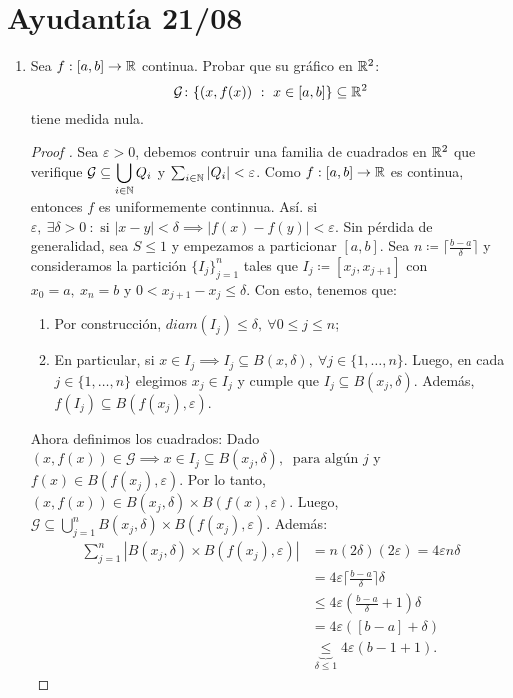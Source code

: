 
\section{Ayudantía 21/08}

\begin{enumerate}
	\item Sea $f: [a,b] \to \mathbb{R}$ continua. Probar que su gráfico en $\mathbb{R}^2$:
	\[ \mathcal{G} \colon \{ (x,f(x)) \ : \ x \in [a,b] \} \subseteq \mathbb{R}^2 \]
	\noindent tiene medida nula.
	\begin{proof}[Proof ]
		Sea $\varepsilon > 0$, debemos contruir una familia de cuadrados en $\mathbb{R}^2$ que verifique $\mathcal{G} \subseteq  \displaystyle\bigcup_{i \in \mathbb{N}} Q_i$ y $\sum_{i \in \mathbb{N}} |Q_i| < \varepsilon$. Como $f: [a,b] \to \mathbb{R}$ es continua, entonces $f$ es uniformemente continnua. Así. si $\varepsilon,\ \exists \delta > 0 \ : \text{ si } |x-y| < \delta \implies |f(x)-f(y)| < \varepsilon$. Sin pérdida de generalidad, sea $S \leq 1$ y empezamos a particionar $[a,b]$. Sea $n \coloneq \lceil \frac{b-a}{\delta} \rceil$ y consideramos la partición $\{ I_j \}_{j=1}^{n}$ tales que $I_j \coloneq [x_{j},x_{j+1}]$ con $x_0 = a,\ x_n = b$ y $0<x_{j+1}-x_j\leq\delta$. Con esto, tenemos que:
		\begin{enumerate}
			\item Por construcción, $diam (I_j) \leq \delta,\ \forall 0 \leq j \leq n$;

			\item En particular, si $x \in I_j \implies I_j \subseteq B(x,\delta),\ \forall j \in \{1,\dots,n\}$. Luego, en cada $j \in \{1,\dots,n\}$ elegimos $x_j \in I_j$ y cumple que $I_j \subseteq B(x_j,\delta)$. Además, $f(I_j) \subseteq B(f(x_j),\varepsilon)$.
		\end{enumerate}
		\noindent Ahora definimos los cuadrados: Dado $(x,f(x)) \in \mathcal{G} \implies x \in I_j \subseteq B(x_j,\delta),\ \text{ para algún } j$ y $f(x) \in B(f(x_j),\varepsilon)$. Por lo tanto, $(x,f(x)) \in B(x_j, \delta) \times B(f(x),\varepsilon)$. Luego, $\mathcal{G} \subseteq \displaystyle{\bigcup_{j=1}^{n}} B(x_j,\delta) \times B(f(x_j),\varepsilon)$. Además:
		\begin{align*}
			\sum_{j=1}^{n} |B(x_j,\delta) \times B(f(x_j),\varepsilon)| & = n(2\delta)(2\varepsilon) = 4\varepsilon n \delta \\
			& = 4 \varepsilon \lceil \frac{b-a}{\delta} \rceil \delta \\
			& \leq 4 \varepsilon \left( \frac{b-a}{\delta} + 1 \right) \delta \\
			& = 4 \varepsilon ([b-a] + \delta) \\ 
			& \underbrace{\leq}_{\delta\leq 1} 4 \varepsilon (b-1 + 1)
		.\end{align*}
	\end{proof}


\end{enumerate}
